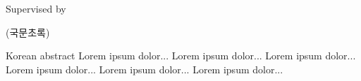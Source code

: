 \cleardoublepage
\thispagestyle{empty}
\doublespacing
\begin{center}
    \ifpdftex 
        {\fontsize{16}{19.2}\selectfont \textbf{\@title}}\\[1.5cm]
    \else 
        {\fontsize{16}{19.2}\selectfont{} \textbf{\@title}}\\[1.5cm]
    \fi 
    {\fontsize{16}{19.2}\selectfont \textbf{\@author}}\\[1.cm]
    {\fontsize{11}{19.2}\selectfont \@department}\\%
    {\fontsize{11}{19.2}\selectfont \@school}\\%
    {\fontsize{11}{19.2}\selectfont Supervised by \@advisor}\\[1.5cm]
\end{center}
(국문초록)

Korean abstract Lorem ipsum dolor... Lorem ipsum dolor... Lorem ipsum dolor... Lorem ipsum dolor... Lorem ipsum dolor... Lorem ipsum dolor...

\restoregeometry
\clearpage